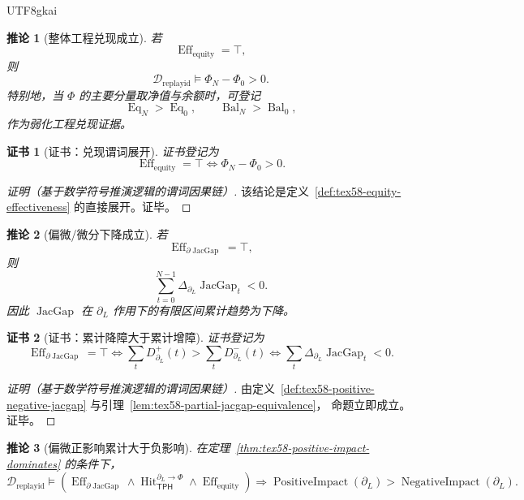 \documentclass[12pt]{article}
\newtheorem{corollary}{推论}[section]
\newtheorem{Certificate}{证书}[section]
\newcommand{\TPH}{\ensuremath{\mathsf{TPH}}}
\DeclareMathOperator{\Eff}{Eff}
\DeclareMathOperator{\Hit}{Hit}
\DeclareMathOperator{\JacGap}{JacGap}
\DeclareMathOperator{\Eq}{Eq}
\DeclareMathOperator{\Bal}{Bal}
\DeclareMathOperator{\PositiveImpact}{PositiveImpact}
\DeclareMathOperator{\NegativeImpact}{NegativeImpact}
\begin{document}
\begin{CJK*}{UTF8}{gkai}
\begin{corollary}[整体工程兑现成立]
\label{cor:tex58-equity-realized}
若
\[
  \Eff_{\mathrm{equity}}=\top,
\]
则
\[
  \mathcal D_{\mathrm{replayid}}\models \Phi_N-\Phi_0>0.
\]
特别地，当 \(\Phi\) 的主要分量取净值与余额时，可登记
\[
  \Eq_N>\Eq_0,
  \qquad
  \Bal_N>\Bal_0,
\]
作为弱化工程兑现证据。
\end{corollary}

\begin{Certificate}[证书：兑现谓词展开]
\label{cert:tex58-equity-realized}
证书登记为
\[
  \Eff_{\mathrm{equity}}=\top
  \Longleftrightarrow
  \Phi_N-\Phi_0>0.
\]
\end{Certificate}

\begin{proof}[证明（基于数学符号推演逻辑的谓词因果链）]
该结论是定义~\ref{def:tex58-equity-effectiveness} 的直接展开。证毕。
\end{proof}

\begin{corollary}[偏微/微分下降成立]
\label{cor:tex58-partial-descent-realized}
若
\[
  \Eff_{\partial\JacGap}=\top,
\]
则
\[
  \sum_{t=0}^{N-1}\Delta_{\partial_L}\JacGap_t<0.
\]
因此 \(\JacGap\) 在 \(\partial_L\) 作用下的有限区间累计趋势为下降。
\end{corollary}

\begin{Certificate}[证书：累计降障大于累计增障]
\label{cert:tex58-partial-descent-realized}
证书登记为
\[
  \Eff_{\partial\JacGap}=\top
  \Longleftrightarrow
  \sum_tD^+_{\partial_L}(t)>\sum_tD^-_{\partial_L}(t)
  \Longleftrightarrow
  \sum_t\Delta_{\partial_L}\JacGap_t<0.
\]
\end{Certificate}

\begin{proof}[证明（基于数学符号推演逻辑的谓词因果链）]
由定义~\ref{def:tex58-positive-negative-jacgap} 与引理~\ref{lem:tex58-partial-jacgap-equivalence}，
命题立即成立。证毕。
\end{proof}

\begin{corollary}[偏微正影响累计大于负影响]
\label{cor:tex58-positive-impact-realized}
在定理~\ref{thm:tex58-positive-impact-dominates} 的条件下，
\[
  \mathcal D_{\mathrm{replayid}}
  \models
  \left(
  \Eff_{\partial\JacGap}
  \wedge
  \Hit_{\TPH}^{\partial_L\to\Phi}
  \wedge
  \Eff_{\mathrm{equity}}
  \right)
  \Rightarrow
  \PositiveImpact(\partial_L)>\NegativeImpact(\partial_L).
\]
\end{corollary}


\end{CJK*}
\end{document}

